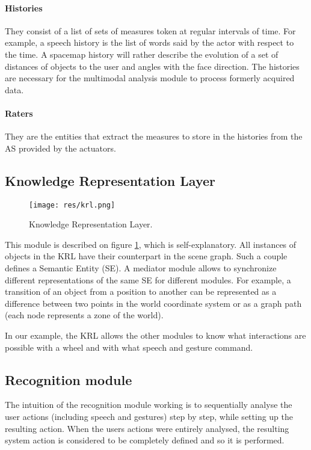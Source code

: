 \documentclass[a4paper]{article}
\begin{document}
\paragraph{Histories} They consist of a list of sets of measures token at regular intervals of time. For example, a speech history is the list of words said by the actor with respect to the time. A spacemap history will rather describe the evolution of a set of distances of objects to the user and angles with the face direction. The histories are necessary for the multimodal analysis module to process formerly acquired data.

\paragraph{Raters} They are the entities that extract the measures to store in the histories from the AS provided by the actuators.

\subsection{Knowledge Representation Layer}

\begin{figure}
\centering
\texttt{[image: res/krl.png]}
\caption{\label{fig:krl}Knowledge Representation Layer.}
\end{figure}

This module is described on figure \ref{fig:krl}, which is self-explanatory. All instances of objects in the KRL have their counterpart in the scene graph. Such a couple defines a Semantic Entity (SE). A mediator module allows to synchronize different representations of the same SE for different modules. For example, a transition of an object from a position to another can be represented as a difference between two points in the world coordinate system or as a graph path (each node represents a zone of the world).

In our example, the KRL allows the other modules to know what interactions are possible with a wheel and with what speech and gesture command.

\subsection{Recognition module}

The intuition of the recognition module working is to sequentially analyse the user actions (including speech and gestures) step by step, while setting up the resulting action. When the users actions were entirely analysed, the resulting system action is considered to be completely defined and so it is performed.
\end{document}
